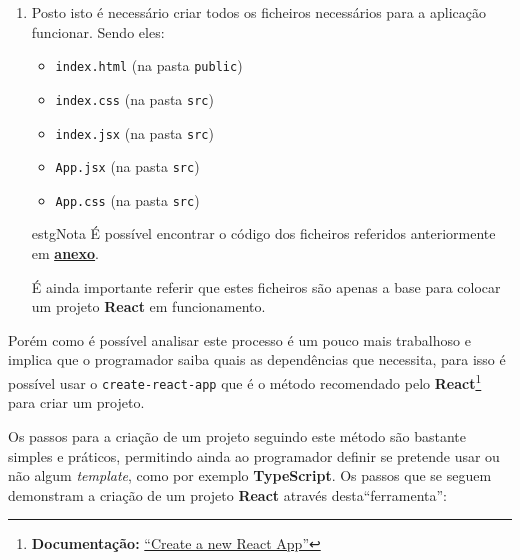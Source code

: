 \begin{enumerate}
	\item Posto isto é necessário criar todos os ficheiros necessários para a aplicação funcionar. Sendo eles:
	\begin{itemize}
		\item \texttt{index.html} {\scriptsize (na pasta \texttt{public})}
		\item \texttt{index.css} {\scriptsize (na pasta \texttt{src})}
		\item \texttt{index.jsx} {\scriptsize (na pasta \texttt{src})}
		\item \texttt{App.jsx} {\scriptsize (na pasta \texttt{src})}
		\item \texttt{App.css} {\scriptsize (na pasta \texttt{src})}
	\end{itemize}

	\vspace{0.25cm}
	\begin{mybox}{estg}{Nota}
		É possível encontrar o código dos ficheiros referidos anteriormente em \underline{\textbf{\hyperref[reactFiles]{anexo}}}.

		É ainda importante referir que estes ficheiros são apenas a base para colocar um projeto \textbf{React} em funcionamento.
	\end{mybox}
\end{enumerate}

Porém como é possível analisar este processo é um pouco mais trabalhoso e implica que o programador saiba quais as dependências que necessita, para isso é possível usar o \texttt{create-react-app} que é o método recomendado pelo \textbf{React}\footnote{\textbf{Documentação:} \href{https://reactjs.org/docs/create-a-new-react-app.html}{``Create a new React App''}} para criar um projeto.

Os passos para a criação de um projeto seguindo este método são bastante simples e práticos, permitindo ainda ao programador definir se pretende usar ou não algum \textit{template}, como por exemplo \textbf{TypeScript}. Os passos que se seguem demonstram a criação de um projeto \textbf{React} através desta``ferramenta'':

